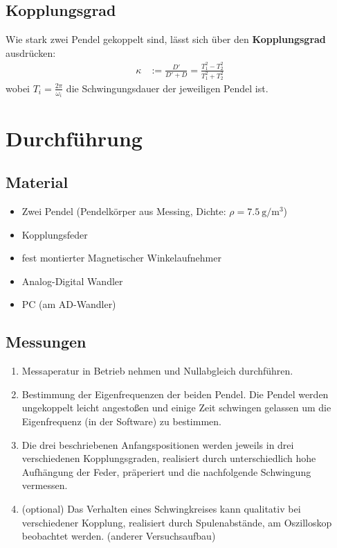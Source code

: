 \subsection{Kopplungsgrad}
Wie stark zwei Pendel gekoppelt sind, lässt sich über den \textbf{Kopplungsgrad} ausdrücken: 
\begin{align}
	\kappa &:= \frac{D'}{D'+D}= \frac{T_1^2-T_2^2}{T_1^2 + T_2^2}
\end{align}
wobei $T_i=\frac{2\pi}{\omega_i}$ die Schwingungsdauer der jeweiligen Pendel ist. 

\section{Durchführung}
\subsection{Material}
\begin{itemize}
	\item Zwei Pendel  (Pendelkörper aus Messing, Dichte: $\rho = \SI{7,5}{\g\per\m\cubed}$)
	\item Kopplungsfeder
	\item fest montierter Magnetischer Winkelaufnehmer 
	\item Analog-Digital Wandler
	\item PC (am AD-Wandler)
\end{itemize}
\subsection{Messungen}
\begin{enumerate}
 \item Messaperatur in Betrieb nehmen und Nullabgleich durchführen.
 \item Bestimmung der Eigenfrequenzen der beiden Pendel. Die Pendel werden ungekoppelt leicht angestoßen und einige Zeit schwingen gelassen um die Eigenfrequenz (in der Software) zu bestimmen.
 \item Die drei beschriebenen Anfangspositionen werden jeweils in drei verschiedenen Kopplungsgraden, realisiert durch unterschiedlich hohe Aufhängung der Feder, präperiert und die nachfolgende Schwingung vermessen. 
 \item (optional) Das Verhalten eines Schwingkreises kann qualitativ bei verschiedener Kopplung, realisiert durch Spulenabstände, am Oszilloskop beobachtet werden. (anderer Versuchsaufbau)
\end{enumerate}


